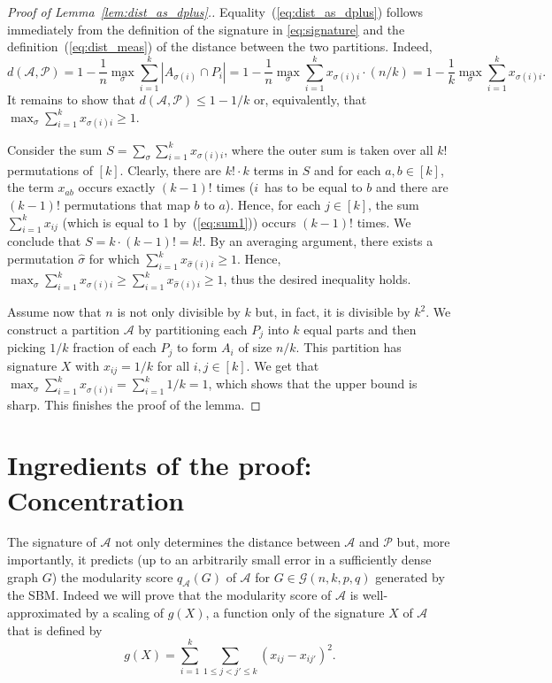 \documentclass[a4paper,UKenglish,cleveref, autoref, thm-restate,numberwithinsect]{lipics-v2021}
\newcommand{\cA}{\mathcal{A}}
\newcommand{\cP}{\mathcal{P}}
\begin{document}
\begin{proof}[Proof of Lemma~\ref{lem:dist_as_dplus}.]
Equality~(\ref{eq:dist_as_dplus}) follows immediately from the definition of the signature in \eqref{eq:signature} and the definition~(\ref{eq:dist_meas}) of the distance between the two partitions. Indeed, 
$$
d(\cA, \cP) = 1 - \frac{1}{n} \max_\sigma \sum_{i=1}^k |A_{\sigma(i)} \cap P_i|  
= 1 - \frac{1}{n} \max_\sigma \sum_{i=1}^k x_{\sigma(i)i} \cdot (n/k)
= 1 - \frac{1}{k} \max_\sigma \sum_{i=1}^k x_{\sigma(i)i}.
$$
It remains to show that $d(\cA, \cP) \le 1 - 1/k$ or, equivalently, that $\max_\sigma \sum_{i=1}^k x_{\sigma(i)i} \ge 1$.

Consider the sum $S = \sum_\sigma \sum_{i=1}^k x_{\sigma(i)i}$, where the outer sum is taken over all $k!$ permutations of $[k]$. Clearly, there are $k! \cdot k$ terms in $S$ and for each $a,b \in [k]$, the term $x_{ab}$ occurs exactly $(k-1)!$ times ($i$~has to be equal to $b$ and there are $(k-1)!$ permutations that map $b$ to $a$). Hence, for each $j \in [k]$, the sum $\sum_{i=1}^k x_{ij}$ (which is equal to 1 by~(\ref{eq:sum1})) occurs $(k-1)!$ times. We conclude that $S = k \cdot (k-1)! = k!$. By an averaging argument, there exists a permutation $\hat{\sigma}$ for which $\sum_{i=1}^k x_{\hat{\sigma}(i)i}\ge 1$. Hence, $\max_\sigma \sum_{i=1}^k x_{\sigma(i)i} \ge \sum_{i=1}^k x_{\hat{\sigma}(i)i} \ge 1$, thus the desired inequality holds.

Assume now that $n$ is not only divisible by $k$ but, in fact, it is divisible by $k^2$. We construct a partition $\cA$ by partitioning each $P_j$ into $k$ equal parts and then picking $1/k$ fraction of each $P_j$ to form $A_i$ of size $n/k$. This partition has signature $X$ with $x_{ij} = 1/k$ for all $i,j \in [k]$. We get that $\max_\sigma \sum_{i=1}^k x_{\sigma(i)i} = \sum_{i=1}^k 1/k = 1$, which shows that the upper bound is sharp. This finishes the proof of the lemma.
\end{proof}


\section{Ingredients of the proof: Concentration}
\label{sec:concentration}

The signature of $\cA$ not only determines the distance between $\cA$ and $\cP$ but, more importantly, it predicts (up to an arbitrarily small error in  a sufficiently dense graph $G$) the modularity score $q_\cA(G)$ of $\cA$ for $G \in \mathcal{G}(n,k,p,q)$ generated by the SBM. Indeed we will prove that the modularity score of $\cA$ is well-approximated by a scaling of $g(X)$, a function only of the signature $X$ of $\cA$ that is defined by
\begin{equation}\label{defn.gx}
g(X) = \sum_{i=1}^k \sum_{1 \le j < j' \le k} (x_{ij} - x_{ij'})^2.
\end{equation}
\end{document}

